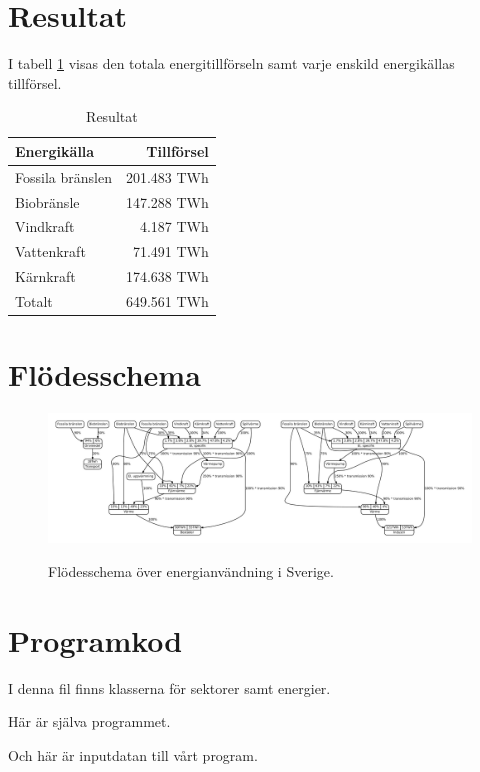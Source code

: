 \documentclass[a4paper,11pt,fleqn, titlepage]{article}
\begin{document}
\section{Resultat}

I tabell \ref{resultat} visas den totala energitillförseln samt varje
enskild energikällas tillförsel.
\begin{table}[h!]
	\centering
	\begin{tabular}{| l | r |}
		\hline
		Energikälla      & Tillförsel \\ \hline
		Fossila bränslen & 201.483 TWh \\
		Biobränsle       & 147.288 TWh \\
		Vindkraft        &   4.187 TWh \\
		Vattenkraft      &  71.491 TWh \\
		Kärnkraft        & 174.638 TWh \\ \hline
		Totalt           & 649.561 TWh \\ \hline
	\end{tabular}
	\caption{Resultat}
	\label{resultat}
\end{table}


\newpage
\appendix

\section{Flödesschema}
\begin{figure}[h!]
	\centering 
	\vspace*{0cm}
	\includegraphics[width=0.6\paperheight,angle=270]{diagram.pdf}
	\label{app:schema}
	\caption{Flödesschema över energianvändning i Sverige.}
\end{figure}

\newpage

\section{Programkod}
I denna fil finns klasserna för sektorer samt energier.


\newpage
Här är själva programmet.


\newpage
Och här är inputdatan till vårt program.

\end{document}
